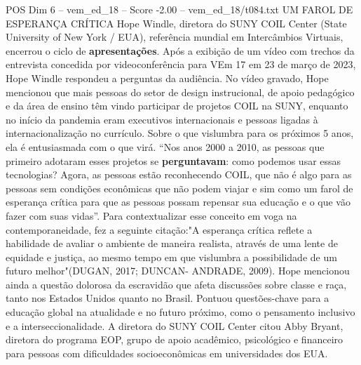 \begin{textsample}{POS Dim 6 – vem\_ed\_18 – Score -2.00 – vem\_ed\_18/t084.txt}  \label{ex:f6_pos_081}
UM FAROL DE ESPERANÇA CRÍTICA Hope Windle, diretora do SUNY COIL Center (State University of New York / EUA), referência mundial em Intercâmbios Virtuais, encerrou o ciclo de \textbf{apresentações}.
Após a exibição de um vídeo com trechos da entrevista concedida por videoconferência para VEm 17 em 23 de março de 2023, Hope Windle respondeu a perguntas da audiência.
No vídeo gravado, Hope mencionou que mais pessoas do setor de design instrucional, de apoio pedagógico e da área de ensino têm vindo participar de projetos COIL na SUNY, enquanto no início da pandemia eram executivos internacionais e pessoas ligadas à internacionalização no currículo.
Sobre o que vislumbra para os próximos 5 anos, ela é entusiasmada com o que virá. “Nos anos 2000 a 2010, as pessoas que primeiro adotaram esses projetos se \textbf{perguntavam}: como podemos usar essas tecnologias?
Agora, as pessoas estão reconhecendo COIL, que não é algo para as pessoas sem condições econômicas que não podem viajar e sim como um farol de esperança crítica para que as pessoas possam repensar sua educação e o que vão fazer com suas vidas”.
Para contextualizar esse conceito em voga na contemporaneidade, fez a seguinte citação:"A esperança crítica reflete a habilidade de avaliar o ambiente de maneira realista, através de uma lente de equidade e justiça, ao mesmo tempo em que vislumbra a possibilidade de um futuro melhor"(DUGAN, 2017; DUNCAN- ANDRADE, 2009).
Hope mencionou ainda a questão dolorosa da escravidão que afeta discussões sobre classe e raça, tanto nos Estados Unidos quanto no Brasil.
Pontuou questões-chave para a educação global na atualidade e no futuro próximo, como o pensamento inclusivo e a interseccionalidade.
A diretora do SUNY COIL Center citou Abby Bryant, diretora do programa EOP, grupo de apoio acadêmico, psicológico e financeiro para pessoas com dificuldades socioeconômicas em universidades dos EUA.

\end{textsample}
